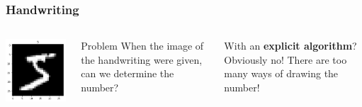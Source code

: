 \documentclass[aspectratio=169]{beamer}
\begin{document}
\begin{frame}[fragile]
	\frametitle{Handwriting}
	\begin{columns}
		\includegraphics[width=1.0\textwidth]{imgs/mnist_5.png}
		\begin{block}{Problem}
			When the image of the handwriting were given, can we determine the number?
		\end{block}
		 With an \textbf{explicit algorithm}? Obviously no! There are too many ways of drawing the number!
	\end{columns}
\end{frame}
\end{document}
